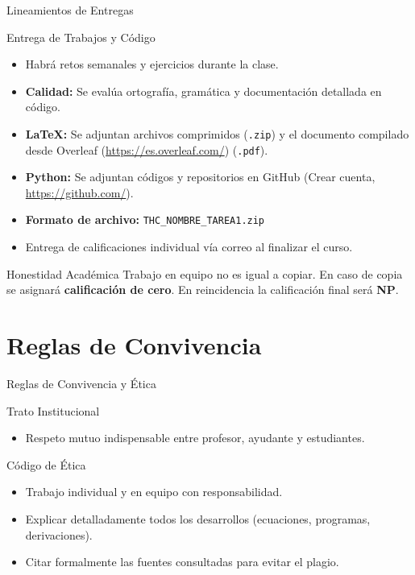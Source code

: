 \documentclass[aspectratio=169, 10pt]{beamer}
\begin{document}
\begin{frame}{Lineamientos de Entregas}
    \begin{block}{Entrega de Trabajos y Código}
    \begin{itemize} \justifying
        \item Habrá retos semanales y ejercicios durante la clase. \pause 
        \item \textbf{Calidad:} Se evalúa ortografía, gramática y documentación detallada en código. \pause
        \item \textbf{\LaTeX{}:} Se adjuntan archivos comprimidos (\texttt{.zip}) y el documento compilado desde Overleaf (\url{https://es.overleaf.com/}) (\texttt{.pdf}). \pause
        \item \textbf{Python:} Se adjuntan códigos y repositorios en GitHub (Crear cuenta, \url{https://github.com/}). \pause
        \item \textbf{Formato de archivo:} \texttt{THC\_NOMBRE\_TAREA1.zip} \pause
        \item Entrega de calificaciones individual vía correo al finalizar el curso.
    \end{itemize}
    \end{block}

    \begin{alertblock}{Honestidad Académica}
        Trabajo en equipo no es igual a copiar. En caso de copia se asignará \textbf{calificación de cero}. En reincidencia la calificación final será \textbf{NP}.
    \end{alertblock}
\end{frame}

\section{Reglas de Convivencia}
\begin{frame}{Reglas de Convivencia y Ética}
    \begin{block}{Trato Institucional}
        \begin{itemize}
            \item Respeto mutuo indispensable entre profesor, ayudante y estudiantes.
        \end{itemize}
    \end{block}

    \begin{block}{Código de Ética}
        \begin{itemize}
            \item Trabajo individual y en equipo con responsabilidad.
            \item Explicar detalladamente todos los desarrollos (ecuaciones, programas, derivaciones).
            \item Citar formalmente las fuentes consultadas para evitar el plagio.
        \end{itemize}
    \end{block}
\end{frame}
\end{document}
